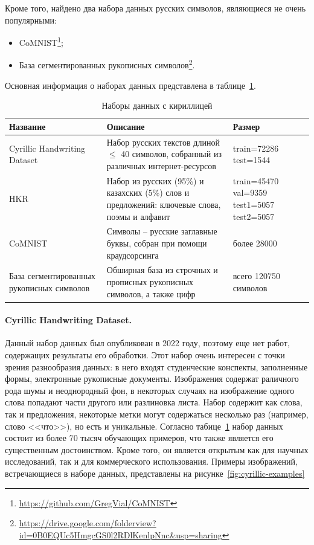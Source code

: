 Кроме того, найдено два набора данных русских символов, являющиеся не очень популярными:
\begin{itemize}
    \item CoMNIST\footnote{\url{https://github.com/GregVial/CoMNIST}};
    \item База сегментированных рукописных символов\footnote{\url{https://drive.google.com/folderview?id=0B0EQUc5HmgcGS0l2RDlKenlpNnc&usp=sharing}}.
\end{itemize}

Основная информация о наборах данных представлена в таблице~\ref{tab:datasets}.

\begin{table}[h!]
    \centering
    \begin{tabular}{|p{4cm}|p{7cm}|p{3cm}|}
        \hline
        \textbf{Название} & \textbf{Описание} & \textbf{Размер} \\
        \hline
        \hline
        Cyrillic Handwriting Dataset & Набор русских текстов длиной $\leqslant$ 40 символов, собранный из различных интернет-ресурсов & train=72286 test=1544 \\
        \hline
        HKR~\cite{nurseitov2021handwritten} & Набор из русских (95\%) и казахских (5\%) слов и предложений: ключевые слова, поэмы и алфавит & train=45470 val=9359 test1=5057 test2=5057 \\
        \hline
        CoMNIST & Символы -- русские заглавные буквы, собран при помощи краудсорсинга & более 28000 \\
        \hline
        База сегментированных рукописных символов & Обширная база из строчных и прописных рукописных символов, а также цифр & всего 120750 символов \\
        \hline
    \end{tabular}
    \caption{Наборы данных с кириллицей}
    \label{tab:datasets}
\end{table}

\paragraph{Cyrillic Handwriting Dataset.}{Данный набор данных был опубликован в 2022 году, поэтому еще нет работ, содержащих результаты его обработки.
Этот набор очень интересен с точки зрения разнообразия данных: в него входят студенческие конспекты, заполненные формы, электронные рукописные документы.
Изображения содержат раличного рода шумы и неоднородный фон, в некоторых случаях на изображение одного слова попадают части другого или разлиновка листа.
Набор содержит как слова, так и предложения, некоторые метки могут содержаться несколько раз (например, слово <<что>>), но есть и уникальные.
Согласно табице~\ref{tab:datasets} набор данных состоит из более 70 тысяч обучающих примеров, что также является его существенным достоинством.
Кроме того, он является открытым как для научных исследований, так и для коммерческого использования.
Примеры изображений, встречающиеся в наборе данных, представлены на рисунке~\ref{fig:cyrillic-examples}}

